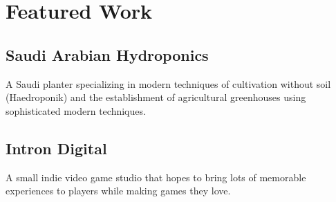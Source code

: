 \section*{Featured Work}
%
%
%
\subsection*{
    Saudi Arabian Hydroponics
}
A Saudi planter specializing in modern techniques of cultivation without soil (Haedroponik) and the establishment of agricultural greenhouses using sophisticated modern techniques.
%
%
\subsection*{
    Intron Digital
}
A small indie video game studio that hopes to bring lots of memorable experiences to players while making games they love.